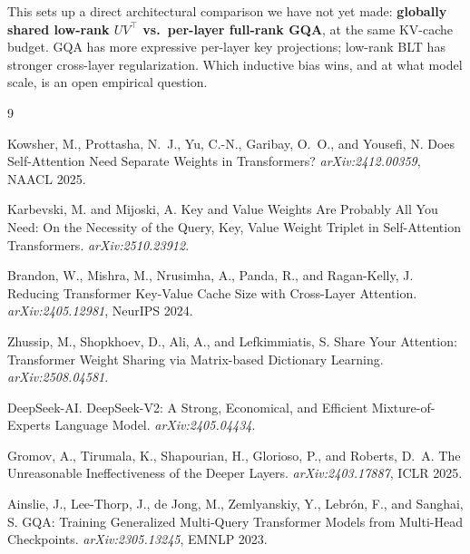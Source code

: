 \documentclass[11pt]{article}
\begin{document}
This sets up a direct architectural comparison we have not yet made: \textbf{globally shared low-rank $UV^\top$ vs.\ per-layer full-rank GQA}, at the same KV-cache budget. GQA has more expressive per-layer key projections; low-rank BLT has stronger cross-layer regularization. Which inductive bias wins, and at what model scale, is an open empirical question.

\begin{thebibliography}{9}

Kowsher, M., Prottasha, N.~J., Yu, C.-N., Garibay, O.~O., and Yousefi, N.
\newblock Does Self-Attention Need Separate Weights in Transformers?
\newblock \emph{arXiv:2412.00359}, NAACL 2025.

Karbevski, M. and Mijoski, A.
\newblock Key and Value Weights Are Probably All You Need: On the Necessity of the Query, Key, Value Weight Triplet in Self-Attention Transformers.
\newblock \emph{arXiv:2510.23912}.

Brandon, W., Mishra, M., Nrusimha, A., Panda, R., and Ragan-Kelly, J.
\newblock Reducing Transformer Key-Value Cache Size with Cross-Layer Attention.
\newblock \emph{arXiv:2405.12981}, NeurIPS 2024.

Zhussip, M., Shopkhoev, D., Ali, A., and Lefkimmiatis, S.
\newblock Share Your Attention: Transformer Weight Sharing via Matrix-based Dictionary Learning.
\newblock \emph{arXiv:2508.04581}.

DeepSeek-AI.
\newblock DeepSeek-V2: A Strong, Economical, and Efficient Mixture-of-Experts Language Model.
\newblock \emph{arXiv:2405.04434}.

Gromov, A., Tirumala, K., Shapourian, H., Glorioso, P., and Roberts, D.~A.
\newblock The Unreasonable Ineffectiveness of the Deeper Layers.
\newblock \emph{arXiv:2403.17887}, ICLR 2025.

Ainslie, J., Lee-Thorp, J., de Jong, M., Zemlyanskiy, Y., Lebr\'on, F., and Sanghai, S.
\newblock GQA: Training Generalized Multi-Query Transformer Models from Multi-Head Checkpoints.
\newblock \emph{arXiv:2305.13245}, EMNLP 2023.

\end{thebibliography}
\end{document}
